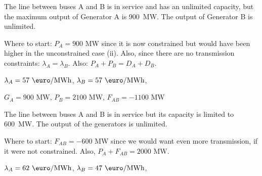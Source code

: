 \documentclass[11pt,a4paper,fleqn]{scrartcl}
\def\l{\lambda}
\def\mw{\text{ MW}}
\def\emwh{\text{ \euro/MWh}}
\begin{document}
\begin{enumerate}[(a)]
\begin{enumerate}[(i)]
  \begin{shaded}\item The   line between buses A and B is in service and has an unlimited capacity, but the maximum output of Generator A is 900~MW. The output of Generator B is unlimited.\end{shaded}
  
  Where to start: 
  $P_A=900$ MW since it is now constrained but would have been higher in the unconstrained case (ii). 
  Also, since there are no transmission constraints: $\l_A = \l_B$.
  Also: $P_A+P_B = D_A+D_B$.

    $\l_A= 57\emwh$, $\l_B=57\emwh$,

  $G_{A}=900\mw$, $P_B=2100$ MW, $F_{AB}=-1100\mw$

  \begin{shaded}\item The line between buses A and B is in service but its capacity is limited to 600~MW. The output of the generators is unlimited.\end{shaded}
  
    Where to start:
    $F_{AB} = - 600$ MW since we would want even more transmission, if it were not constrained.
    Also, $P_A+F_{AB}=2000$ MW.

    $\l_A= 62\emwh$, $\l_B=47\emwh$,


\end{enumerate}
\end{enumerate}
\end{document}
